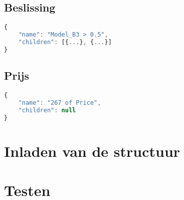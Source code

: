 \subsection{Beslissing}
\begin{lstlisting}[language=JavaScript]
{
    "name": "Model_B3 > 0.5",
    "children": [{...}, {...}]
}    
\end{lstlisting}

\subsection{Prijs}
\begin{lstlisting}[language=JavaScript]
{
    "name": "267 of Price",
    "children": null
}    
\end{lstlisting}
\section{Inladen van de structuur}

\section{Testen}
